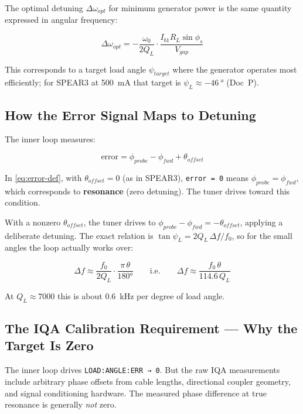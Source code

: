 The optimal detuning \(\Delta\omega_{opt}\) for minimum generator power is the same quantity expressed in angular frequency:

\begin{equation}\label{eq:detune-opt}
  \Delta\omega_{opt} = -\frac{\omega_0}{2Q_L} \cdot \frac{I_{b1} R_L \sin\phi_s}{V_{gap}}
\end{equation}

This corresponds to a target load angle \(\psi_{target}\) where the generator operates most efficiently; for SPEAR3 at \qty{500}{\milli\ampere} that target is \(\psi_{L} \approx \qty{-46}{\degree}\) (Doc~P).

\subsection{How the Error Signal Maps to Detuning}\label{sec:error-to-detuning}


The inner loop measures:

\begin{equation}\label{eq:error-def}
  \text{error} = \phi_{probe} - \phi_{fwd} + \theta_{offset}
\end{equation}

In \cref{eq:error-def}, with \(\theta_{offset} = 0\) (as in SPEAR3), \texttt{error\ =\ 0} means \(\phi_{probe} = \phi_{fwd}\), which corresponds to \textbf{resonance} (zero detuning). The tuner drives toward this condition.

With a nonzero \(\theta_{offset}\), the tuner drives to \(\phi_{probe} - \phi_{fwd} = -\theta_{offset}\), applying a deliberate detuning. The exact relation is \(\tan\psi_L = 2Q_L\,\Delta f/f_0\), so for the small angles the loop actually works over:

\begin{equation}\label{eq:theta-to-df}
  \Delta f \approx \frac{f_0}{2 Q_L}\cdot\frac{\pi\,\theta}{180°}
  \qquad\text{i.e.}\qquad \Delta f \approx \frac{f_0\,\theta}{114.6\,Q_L}
\end{equation}

At \(Q_L \approx 7000\) this is about \qty{0.6}{\kilo\hertz} per degree of load angle.

\subsection{The IQA Calibration Requirement --- Why the Target Is Zero}\label{sec:iqa-calibration}


The inner loop drives \texttt{LOAD:\allowbreak{}ANGLE:\allowbreak{}ERR\ →\ 0}. But the raw IQA measurements include arbitrary phase offsets from cable lengths, directional coupler geometry, and signal conditioning hardware. The measured phase difference at true resonance is generally \emph{not} zero.

